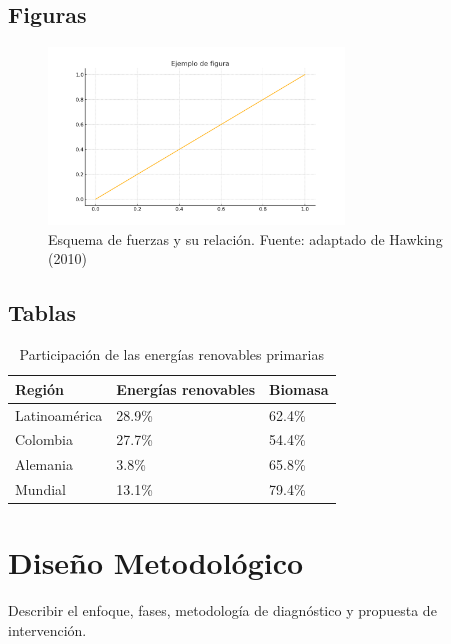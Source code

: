 \documentclass[12pt]{article}
\newcommand{\chapterbreak}{\clearpage \thispagestyle{fancy}}
\begin{document}
\subsection*{Figuras}
\begin{figure}[H]
\centering
\includegraphics[width=0.7\textwidth]{assets/figura1.png}
\caption{Esquema de fuerzas y su relaci\'on. Fuente: adaptado de Hawking (2010)}
\end{figure}
\subsection*{Tablas}
\begin{table}[H]
\centering
\caption{Participaci\'on de las energías renovables primarias}
\begin{tabular}{|l|l|l|}
\hline
Región & Energías renovables & Biomasa \\
\hline
Latinoam\'erica & 28.9\% & 62.4\% \\
Colombia & 27.7\% & 54.4\% \\
Alemania & 3.8\% & 65.8\% \\
Mundial & 13.1\% & 79.4\% \\
\hline
\end{tabular}
\end{table}

\chapterbreak

\section{Diseño Metodológico}
Describir el enfoque, fases, metodolog\'ia de diagn\'ostico \cite{gonzalezModeloAdministracionProyectos2012} y propuesta de intervenci\'on.

\chapterbreak
\end{document}
